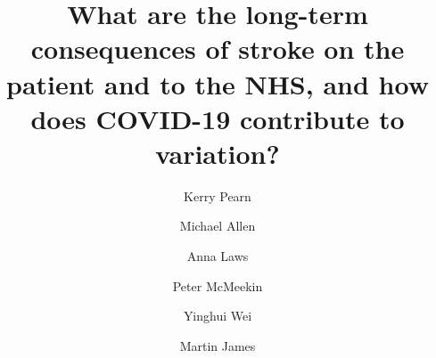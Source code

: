 \title{What are the long-term consequences of stroke on the patient and to the NHS, and how does COVID-19 contribute to variation?} 

\renewcommand{\thefootnote}{\fnsymbol{footnote}}
\author[1,2]{Kerry Pearn}
\author[*1,2]{Michael Allen}
\author[1,2]{Anna Laws}
\author[4]{Peter McMeekin}
\author[1,2]{Yinghui Wei}
\author[1,2]{Martin James}



\date{}